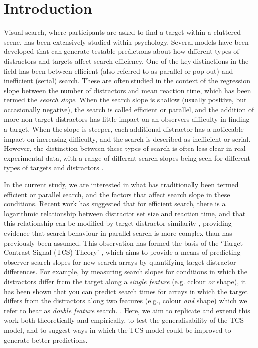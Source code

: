 \documentclass[preprint,12pt,authoryear]{elsarticle}
\begin{document}
\section{Introduction}
\label{intro}

Visual search, where participants are asked to find a target within a cluttered scene, has been extensively studied within psychology. Several models have been developed that can generate testable predictions about how different types of distractors and targets affect search efficiency. One of the key distinctions in the field has been between efficient (also referred to as parallel or pop-out) and inefficient (serial) search. These are often studied in the context of the regression slope between the number of distractors and mean reaction time, which has been termed the \textit{search slope}. When the search slope is shallow (usually positive, but occasionally negative), the search is called efficient or parallel, and the addition of more non-target distractors has little impact on an observers difficulty in finding a target. When the slope is steeper, each additional distractor has a noticeable impact on increasing difficulty, and the search is described as inefficient or serial. However, the distinction between these types of search is often less clear in real experimental data, with a range of different search slopes being seen for different types of targets and distractors \citep{cave1990modeling}.

In the current study, we are interested in what has traditionally been termed efficient or parallel search, and the factors that affect search slope in these conditions. Recent work has suggested that for efficient search, there is a logarithmic relationship between distractor set size and reaction time, and that this relationship can be modified by target-distractor similarity \citep{buetti2016towards}, providing evidence that search behaviour in parallel search is more complex than has previously been assumed. This observation has formed the basis of the `Target Contrast Signal (TCS) Theory' \citep{lleras2020target}, which aims to provide a means of predicting observer search slopes for new search arrays by quantifying target-distractor differences. For example, by measuring search slopes for conditions in which the distractors differ from the target along a \textit{single feature} (e.g. colour \textit{or} shape), it has been shown that you can predict search times for arrays in which the target differs from the distractors along two features (e.g., colour \textit{and} shape) which we refer to hear as \textit{double feature} search. \citep{buetti2019predicting}. Here, we aim to replicate and extend this work both theoretically and empirically, to test the generalisability of the TCS model, and to suggest ways in which the TCS model could be improved to generate better predictions.
\end{document}
